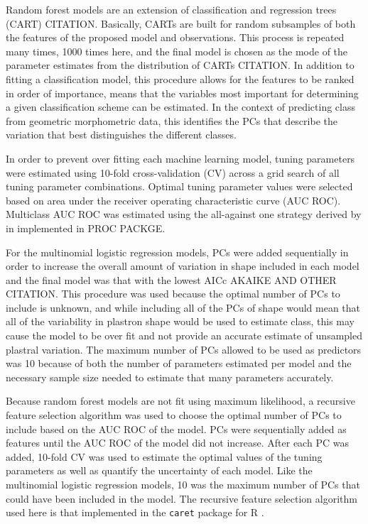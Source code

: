 \documentclass[12pt]{article}\usepackage{graphicx, color}
\begin{document}
Random forest models are an extension of classification and regression trees (CART) CITATION. Basically, CARTs are built for random subsamples of both the features of the proposed model and observations. This process is repeated many times, 1000 times here, and the final model is chosen as the mode of the parameter estimates from the distribution of CARTs CITATION. In addition to fitting a classification model, this procedure allows for the features to be ranked in order of importance, means that the variables most important for determining a given classification scheme can be estimated. In the context of predicting class from geometric morphometric data, this identifies the PCs that describe the variation that best distinguishes the different classes.


In order to prevent over fitting each machine learning model, tuning parameters were estimated using 10-fold cross-validation (CV) across a grid search of all tuning parameter combinations. Optimal tuning parameter values were selected based on area under the receiver operating characteristic curve (AUC ROC). Multiclass AUC ROC was estimated using the all-against one strategy derived by \citet{Hand2001} in implemented in PROC PACKGE.

For the multinomial logistic regression models, PCs were added sequentially in order to increase the overall amount of variation in shape included in each model and the final model was that with the lowest AICc \citep{Burnham2002a} AKAIKE AND OTHER CITATION. This procedure was used because the optimal number of PCs to include is unknown, and while including all of the PCs of shape would mean that all of the variability in plastron shape would be used to estimate class, this may cause the model to be over fit and not provide an accurate estimate of unsampled plastral variation. The maximum number of PCs allowed to be used as predictors was 10 because of both the number of parameters estimated per model and the necessary sample size needed to estimate that many parameters accurately. 

Because random forest models are not fit using maximum likelihood, a recursive feature selection algorithm was used to choose the optimal number of PCs to include based on the AUC ROC of the model. PCs were sequentially added as features until the AUC ROC of the model did not increase. After each PC was added, 10-fold CV was used to estimate the optimal values of the tuning parameters as well as quantify the uncertainty of each model. Like the multinomial logistic regression models, 10 was the maximum number of PCs that could have been included in the model. The recursive feature selection algorithm used here is that implemented in the \texttt{caret} package for R \citep{Kuhn2013}.
\end{document}
